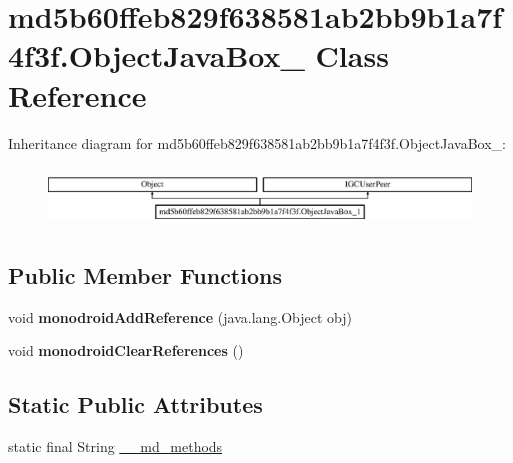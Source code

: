 \hypertarget{classmd5b60ffeb829f638581ab2bb9b1a7f4f3f_1_1ObjectJavaBox__1}{}\section{md5b60ffeb829f638581ab2bb9b1a7f4f3f.\+Object\+Java\+Box\+\_ Class Reference}
\label{classmd5b60ffeb829f638581ab2bb9b1a7f4f3f_1_1ObjectJavaBox__1}
Inheritance diagram for md5b60ffeb829f638581ab2bb9b1a7f4f3f.\+Object\+Java\+Box\+\_\+:\begin{figure}[H]
\begin{center}
\leavevmode
\includegraphics[height=1.586402cm]{classmd5b60ffeb829f638581ab2bb9b1a7f4f3f_1_1ObjectJavaBox__1}
\end{center}
\end{figure}
\subsection*{Public Member Functions}
\begin{DoxyCompactItemize}
\item 
\mbox{\label{classmd5b60ffeb829f638581ab2bb9b1a7f4f3f_1_1ObjectJavaBox__1_af2bae9bb53179373bfbbef8b7fa568b1}} 
void {\bfseries monodroid\+Add\+Reference} (java.\+lang.\+Object obj)
\item 
\mbox{\label{classmd5b60ffeb829f638581ab2bb9b1a7f4f3f_1_1ObjectJavaBox__1_a4218e4072c05c7d03d73208e68933721}} 
void {\bfseries monodroid\+Clear\+References} ()
\end{DoxyCompactItemize}
\subsection*{Static Public Attributes}
\begin{DoxyCompactItemize}
\item 
static final String \hyperlink{classmd5b60ffeb829f638581ab2bb9b1a7f4f3f_1_1ObjectJavaBox__1_a71c23a08d05ad66171fa5a28f857587d}{\+\_\+\+\_\+md\+\_\+methods}
\end{DoxyCompactItemize}
